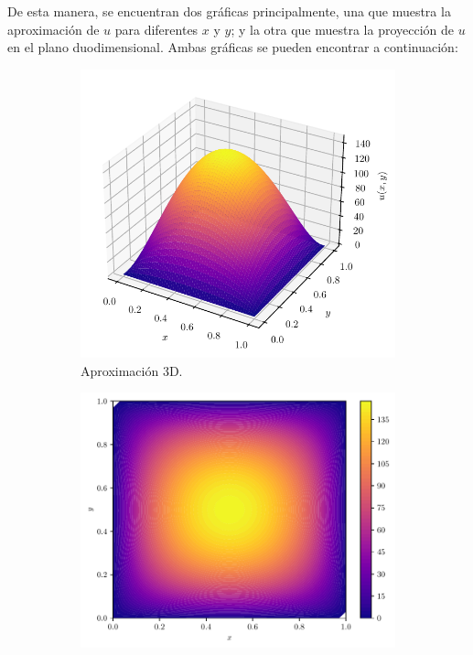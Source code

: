 \documentclass[fleqn]{article}
\begin{document}
\begin{enumerate}
\begin{enumerate}
                \inputminted{python}{../exercises/exam.py}
                De esta manera, se encuentran dos gráficas principalmente, una
                que muestra la aproximación de $u$ para diferentes $x$ y $y$; y
                la otra que muestra la proyección de $u$ en el plano
                duodimensional. Ambas gráficas se pueden encontrar a
                continuación:
                \begin{figure}[H]
                  \begin{subfigure}[b]{0.45\textwidth}
                    \centering \includegraphics[scale=.7]{figs/plot3d}
                    \caption{Aproximación 3D.}
                  \end{subfigure}
                  \begin{subfigure}[b]{0.45\textwidth}
                    \centering \includegraphics[scale=.5]{figs/plot2d}

\end{subfigure}
\end{figure}
\end{enumerate}
\end{enumerate}
\end{document}
